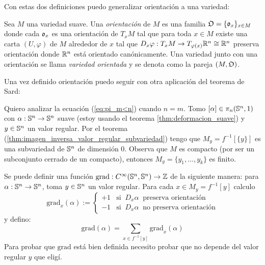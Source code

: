 \documentclass[../../topologia_algebraica]{subfiles}
\begin{document}
Con estas dos definiciones puedo generalizar orientaci\'on a una variedad:

\begin{defin}
  Sea $M$ una variedad suave. Una \emph{orientaci\'on} de $M$ es una familia $\mathfrak{O}=\{\mathfrak{o}_x\}_{x\in M}$
  donde cada $\mathfrak{o}_x$ es una orientaci\'on de $T_xM$ tal que para toda $x\in M$ existe una carta
  $(U,\varphi)$ de $M$ alrededor de $x$ tal que $D_x\varphi:T_xM \rightarrow T_{\varphi(x)}\mathbb{R}^n\cong\mathbb{R}^n$
  preserva orientaci\'on donde $\mathbb{R}^n$ est\'a orientado can\'onicamente. Una variedad junto
  con una orientaci\'on se llama \emph{variedad orientada} y se denota como la pareja $(M,\mathfrak{O})$.
\end{defin}

Una vez definido orientaci\'on puedo seguir con otra aplicaci\'on del teorema de Sard:

Quiero analizar la ecuaci\'on (\ref{eq:pi_m<n}) cuando $n=m$. Tomo $[\alpha]\in\pi_n(\mathbb{S}^n,1)$
con $\alpha:\mathbb{S}^n\rightarrow\mathbb{S}^n$ suave (estoy usando el teorema \ref{thm:deformacion_suave}) y $y\in\mathbb{S}^n$
un valor regular. Por el teorema (\ref{thm:imagen_inversa_valor_regular_subvariedad}) tengo que
$M_y=f^{-1}[\{y\}]$ es una subvariedad de $\mathbb{S}^n$ de dimensi\'on $0$. Observa que $M$ es compacto
(por ser un subconjunto cerrado de un compacto), entonces $M_y=\{y_1,\ldots,y_k\}$ es finito.

Se puede definir una funci\'on $\text{grad}:C^{\infty}(\mathbb{S}^n,\mathbb{S}^n)\rightarrow\mathbb{Z}$ de la siguiente manera:
para $\alpha:\mathbb{S}^n\rightarrow\mathbb{S}^n$, toma $y\in\mathbb{S}^n$ un valor regular. Para cada $x\in M_y=f^{-1}[y]$
calculo
\[
  \text{grad}_{x}(\alpha):=
  \begin{cases}
    +1 & \text{si}\;\; D_{x}\alpha\;\;\text{preserva orientaci\'on} \\
    -1 & \text{si}\;\; D_{x}\alpha\;\;\text{no preserva orientaci\'on}
  \end{cases}
\]
y defino:
\[
  \text{grad}(\alpha)=\sum_{x\in f^{-1}[y]}\text{grad}_x(\alpha)
\]
Para probar que $\text{grad}$ est\'a bien definida necesito probar que no depende del valor regular
$y$ que elig\'i.
\end{document}
